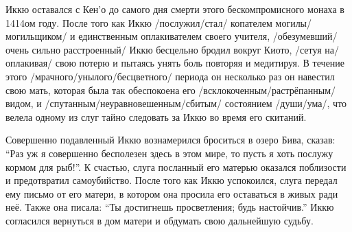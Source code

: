 \begin{ver}
  Иккю оставался с Кен'о до самого дня смерти этого бескомпромисного
  монаха в 1414ом году. После того как Иккю /послужил/стал/ копателем
  могилы/могильщиком/ и единственным оплакивателем своего учителя,
  /обезумевший/очень сильно расстроенный/ Иккю бесцельно бродил вокруг
  Киото, /сетуя на/оплакивая/ свою потерю и пытаясь унять боль
  повторяя и медитируя.  В течение этого
  /мрачного/унылого/бесцветного/ периода он несколько раз он навестил
  свою мать, которая была так обеспокоена его
  /всклокоченным/растрёпанным/ видом, и
  /спутанным/неуравновешенным/сбитым/ состоянием /души/ума/, что
  велела одному из слуг тайно следовать за Иккю во время его скитаний.

  Совершенно подавленный Иккю вознамерился броситься в озеро Бива,
  сказав: ``Раз уж я совершенно бесполезен здесь в этом мире, то пусть я хоть послужу кормом для рыб!''.
  К счастью, слуга посланный его матерью оказался поблизости и
  предотвратил самоубийство. После того как Иккю успокоился, слуга
  передал ему письмо от его матери, в котором она просила его
  оставаться в живых ради неё. 
  Также она писала: ``Ты достигнешь просветления; будь настойчив.''
  Иккю согласился вернуться в дом матери и обдумать свою дальнейшую судьбу.
\end{ver}
